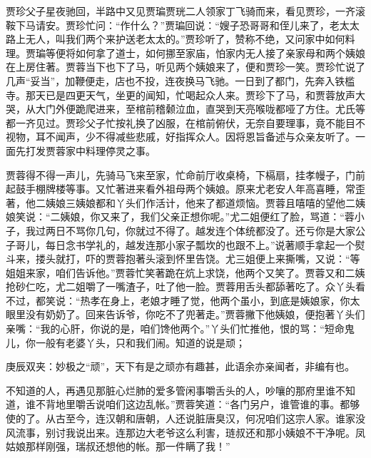 \begin{parag}
    贾珍父子星夜驰回，半路中又见贾㻞贾珖二人领家丁飞骑而来，看见贾珍，一齐滚鞍下马请安。贾珍忙问：“作什么？”贾㻞回说：“嫂子恐哥哥和侄儿来了，老太太路上无人，叫我们两个来护送老太太的。”贾珍听了，赞称不绝，又问家中如何料理。贾㻞等便将如何拿了道士，如何挪至家庙，怕家内无人接了亲家母和两个姨娘在上房住著。贾蓉当下也下了马，听见两个姨娘来了，便和贾珍一笑。贾珍忙说了几声“妥当”，加鞭便走，店也不投，连夜换马飞驰。一日到了都门，先奔入铁槛寺。那天已是四更天气，坐更的闻知，忙喝起众人来。贾珍下了马，和贾蓉放声大哭，从大门外便跪爬进来，至棺前稽颡泣血，直哭到天亮喉咙都哑了方住。尤氏等都一齐见过。贾珍父子忙按礼换了凶服，在棺前俯伏，无奈自要理事，竟不能目不视物，耳不闻声，少不得减些悲戚，好指挥众人。因将恩旨备述与众亲友听了。一面先打发贾蓉家中料理停灵之事。
\end{parag}


\begin{parag}
    贾蓉得不得一声儿，先骑马飞来至家，忙命前厅收桌椅，下槅扇，挂孝幔子，门前起鼓手棚牌楼等事。又忙著进来看外祖母两个姨娘。原来尤老安人年高喜睡，常歪著，他二姨娘三姨娘都和丫头们作活计，他来了都道烦恼。贾蓉且嘻嘻的望他二姨娘笑说：“二姨娘，你又来了，我们父亲正想你呢。”尤二姐便红了脸，骂道：“蓉小子，我过两日不骂你几句，你就过不得了。越发连个体统都没了。还亏你是大家公子哥儿，每日念书学礼的，越发连那小家子瓢坎的也跟不上。”说著顺手拿起一个熨斗来，搂头就打，吓的贾蓉抱著头滚到怀里告饶。尤三姐便上来撕嘴，又说：“等姐姐来家，咱们告诉他。”贾蓉忙笑著跪在炕上求饶，他两个又笑了。贾蓉又和二姨抢砂仁吃，尤二姐嚼了一嘴渣子，吐了他一脸。贾蓉用舌头都舔著吃了。众丫头看不过，都笑说：“热孝在身上，老娘才睡了觉，他两个虽小，到底是姨娘家，你太眼里没有奶奶了。回来告诉爷，你吃不了兜著走。”贾蓉撇下他姨娘，便抱著丫头们亲嘴：“我的心肝，你说的是，咱们馋他两个。”丫头们忙推他，恨的骂：“短命鬼儿，你一般有老婆丫头，只和我们闹。知道的说是顽；\begin{note}庚辰双夹：妙极之“顽”，天下有是之顽亦有趣甚，此语余亦亲闻者，非编有也。\end{note}不知道的人，再遇见那脏心烂肺的爱多管闲事嚼舌头的人，吵嚷的那府里谁不知道，谁不背地里嚼舌说咱们这边乱帐。”贾蓉笑道：“各门另户，谁管谁的事。都够使的了。从古至今，连汉朝和唐朝，人还说脏唐臭汉，何况咱们这宗人家。谁家没风流事，别讨我说出来。连那边大老爷这么利害，琏叔还和那小姨娘不干净呢。凤姑娘那样刚强，瑞叔还想他的帐。那一件瞒了我！”
\end{parag}



